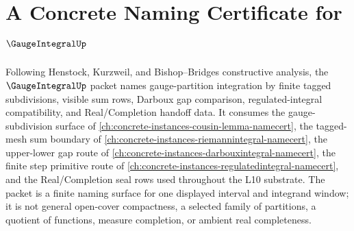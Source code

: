 \chapter{A Concrete Naming Certificate for $\GaugeIntegralUp$}
\label{ch:concrete-instances-gauge-integral-namecert}

Following Henstock, Kurzweil, and Bishop--Bridges constructive analysis, the $\GaugeIntegralUp$ packet names gauge-partition integration by finite tagged subdivisions, visible sum rows, Darboux gap comparison, regulated-integral compatibility, and Real/Completion handoff data. It consumes the gauge-subdivision surface of \autoref{ch:concrete-instances-cousin-lemma-namecert}, the tagged-mesh sum boundary of \autoref{ch:concrete-instances-riemannintegral-namecert}, the upper-lower gap route of \autoref{ch:concrete-instances-darbouxintegral-namecert}, the finite step primitive route of \autoref{ch:concrete-instances-regulatedintegral-namecert}, and the Real/Completion seal rows used throughout the L10 substrate. The packet is a finite naming surface for one displayed interval and integrand window; it is not general open-cover compactness, a selected family of partitions, a quotient of functions, measure completion, or ambient real completeness.

